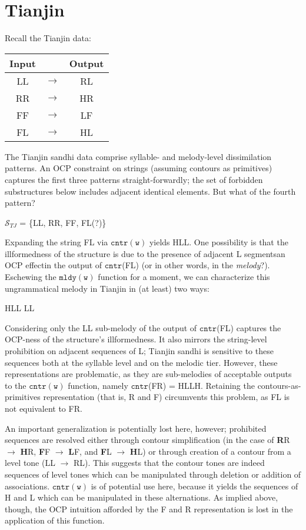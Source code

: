 \documentclass{article}
\begin{document}
\section{Tianjin}
Recall the Tianjin data:
\begin{exe}
\ex
\begin{tabular}[t]{ccc}
 Input && Output \\
 \hline
LL & $\rightarrow$ & RL \\
RR & $\rightarrow$ & HR \\
FF & $\rightarrow$ & LF \\
FL & $\rightarrow$ & HL \\
\end{tabular}
\end{exe}
The Tianjin sandhi data comprise syllable- and melody-level dissimilation patterns. An OCP constraint on strings (assuming contours as primitives) captures the first three patterns straight-forwardly; the set of forbidden substructures below includes adjacent identical elements. But what of the fourth pattern?
\begin{exe}
\ex
$\mathcal{S}_{TJ}$ = \{LL, RR, FF, FL(?)\}
\end{exe}
Expanding the string FL via $\mathtt{cntr(w)}$ yields HLL. One possibility is that the illformedness of the structure is due to the presence of adjacent L segments\textemdash an OCP effect\textemdash in the output of $\mathtt{cntr}$(FL) (or in other words, in the \textit{melody}?). Eschewing the $\mathtt{mldy(w)}$ function for a moment, we can characterize this ungrammatical melody in Tianjin in (at least) two ways:
\begin{exe}
\ex
\begin{xlist}
	\ex HLL
	\ex LL
\end{xlist}
\end{exe}
Considering only the LL sub-melody of the output of $\mathtt{cntr}$(FL) captures the OCP-ness of the structure's illformedness. It also mirrors the string-level prohibition on adjacent sequences of L; Tianjin sandhi is sensitive to these sequences both at the syllable level and on the melodic tier. However, these representations are problematic, as they are sub-melodies of acceptable outputs to the $\mathtt{cntr(w)}$ function, namely $\mathtt{cntr}$(FR) = HLLH. Retaining the contours-as-primitives representation (that is, R and F) circumvents this problem, as FL is not equivalent to FR. \par
An important generalization is potentially lost here, however; prohibited sequences are resolved either through contour simplification (in the case of \textbf{R}R $\rightarrow$ \textbf{H}R, \textbf{F}F $\rightarrow$ \textbf{L}F, and \textbf{F}L $\rightarrow$ \textbf{H}L) or through creation of a contour from a level tone (LL $\rightarrow$ RL). This suggests that the contour tones are indeed sequences of level tones which can be manipulated through deletion or addition of associations. $\mathtt{cntr(w)}$ is of potential use here, because it yields the sequences of H and L which can be manipulated in these alternations. As implied above, though, the OCP intuition afforded by the F and R representation is lost in the application of this function.
\end{document}
